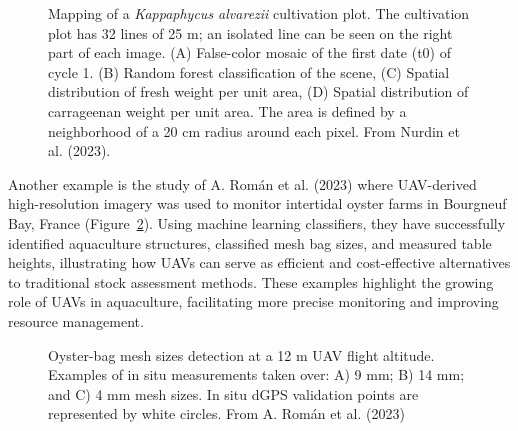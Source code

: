 \documentclass[
  letterpaper,
  11pt,
  english,
  singlespacing,
  headsepline]{MastersDoctoralThesis}
\begin{document}
\begin{spacing}{1.5}
\begin{figure}
{}

\caption{\label{fig-Mapping_kappa}Mapping of a \emph{Kappaphycus
alvarezii} cultivation plot. The cultivation plot has 32 lines of 25 m;
an isolated line can be seen on the right part of each image. (A)
False-color mosaic of the first date (t0) of cycle 1. (B) Random forest
classification of the scene, (C) Spatial distribution of fresh weight
per unit area, (D) Spatial distribution of carrageenan weight per unit
area. The area is defined by a neighborhood of a 20 cm radius around
each pixel. From Nurdin et al. (2023).}

\end{figure}%

Another example is the study of A. Román et al. (2023) where UAV-derived
high-resolution imagery was used to monitor intertidal oyster farms in
Bourgneuf Bay, France (Figure~\ref{fig-Mapping_oyster}). Using machine
learning classifiers, they have successfully identified aquaculture
structures, classified mesh bag sizes, and measured table heights,
illustrating how UAVs can serve as efficient and cost-effective
alternatives to traditional stock assessment methods. These examples
highlight the growing role of UAVs in aquaculture, facilitating more
precise monitoring and improving resource management.

\begin{figure}


\caption{\label{fig-Mapping_oyster}Oyster-bag mesh sizes detection at a
12 m UAV flight altitude. Examples of in situ measurements taken over:
A) 9 mm; B) 14 mm; and C) 4 mm mesh sizes. In situ dGPS validation
points are represented by white circles. From A. Román et al. (2023)}


\end{figure}
\end{spacing}
\end{document}
